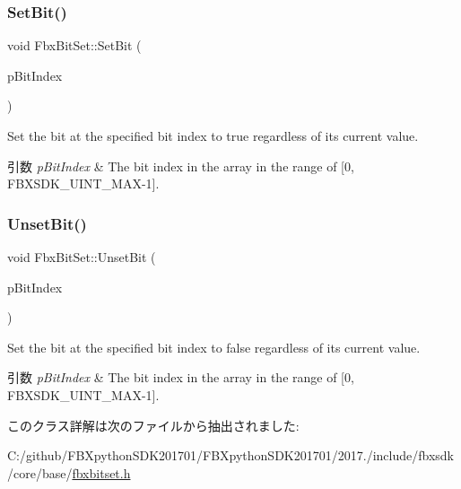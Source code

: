 \subsubsection{\texorpdfstring{Set\+Bit()}{SetBit()}}
{\footnotesize\ttfamily void Fbx\+Bit\+Set\+::\+Set\+Bit (\begin{DoxyParamCaption}\item[{const \hyperlink{fbxtypes_8h_ae9fb141d8158a730aa85ec5ff2ea3f6b}{Fbx\+U\+Int}}]{p\+Bit\+Index }\end{DoxyParamCaption})}

Set the bit at the specified bit index to true regardless of its current value. 
\begin{DoxyParams}{引数}
{\em p\+Bit\+Index} & The bit index in the array in the range of \mbox{[}0, F\+B\+X\+S\+D\+K\+\_\+\+U\+I\+N\+T\+\_\+\+M\+A\+X-\/1\mbox{]}. \\
\hline
\end{DoxyParams}
\mbox{\label{class_fbx_bit_set_ade99ba2a4fc49743b4d2e2037a5d4e28}} 
\subsubsection{\texorpdfstring{Unset\+Bit()}{UnsetBit()}}
{\footnotesize\ttfamily void Fbx\+Bit\+Set\+::\+Unset\+Bit (\begin{DoxyParamCaption}\item[{const \hyperlink{fbxtypes_8h_ae9fb141d8158a730aa85ec5ff2ea3f6b}{Fbx\+U\+Int}}]{p\+Bit\+Index }\end{DoxyParamCaption})}

Set the bit at the specified bit index to false regardless of its current value. 
\begin{DoxyParams}{引数}
{\em p\+Bit\+Index} & The bit index in the array in the range of \mbox{[}0, F\+B\+X\+S\+D\+K\+\_\+\+U\+I\+N\+T\+\_\+\+M\+A\+X-\/1\mbox{]}. \\
\hline
\end{DoxyParams}


このクラス詳解は次のファイルから抽出されました\+:\begin{DoxyCompactItemize}
\item 
C\+:/github/\+F\+B\+Xpython\+S\+D\+K201701/\+F\+B\+Xpython\+S\+D\+K201701/2017./include/fbxsdk/core/base/\hyperlink{fbxbitset_8h}{fbxbitset.\+h}\end{DoxyCompactItemize}
